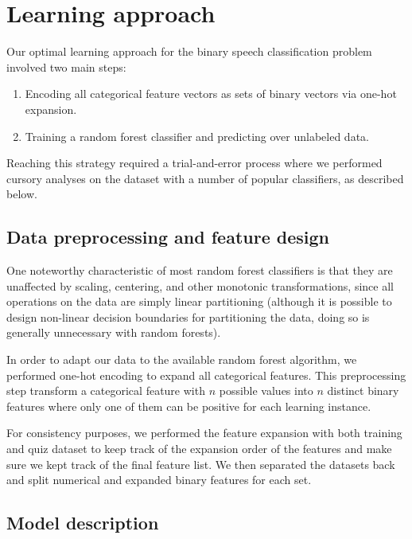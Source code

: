 \documentclass[11pt,a4paper]{article}
\begin{document}
\section{Learning approach}

Our optimal learning approach for the binary speech classification problem involved two main steps:

\begin{enumerate}
  \item Encoding all categorical feature vectors as sets of binary vectors via one-hot expansion.
  \item Training a random forest classifier and predicting over unlabeled data.
\end{enumerate}

Reaching this strategy required a trial-and-error process where we performed cursory analyses on the dataset with a number of popular classifiers, as described below.

\subsection{Data preprocessing and feature design}
One noteworthy characteristic of most random forest classifiers is that they are unaffected by scaling, centering, and other monotonic transformations, since all operations on the data are simply linear partitioning (although it is possible to design non-linear decision boundaries for partitioning the data, doing so is generally unnecessary with random forests).\par
In order to adapt our data to the available random forest algorithm, we performed one-hot encoding to expand all categorical features. This preprocessing step transform a categorical feature with $n$ possible values into $n$ distinct binary features where only one of them can be positive for each learning instance.\par
For consistency purposes, we performed the feature expansion with both training and quiz dataset to keep track of the expansion order of the features and make sure we kept track of the final feature list. We then separated the datasets back and split numerical and expanded binary features for each set.

\subsection{Model description}
\end{document}
